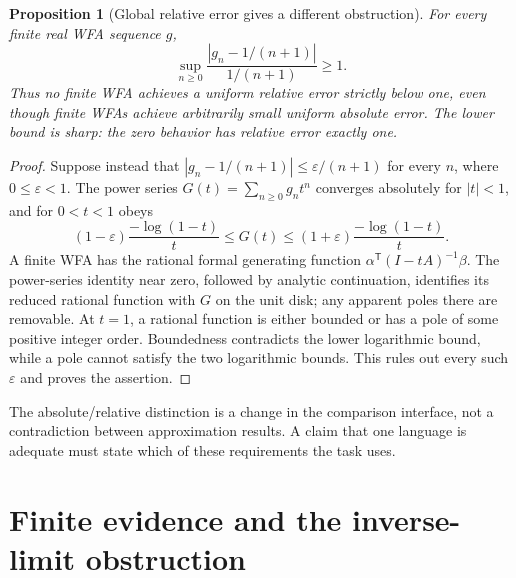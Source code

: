 \documentclass[11pt]{article}
\newtheorem{proposition}[theorem]{Proposition}
\theoremstyle{definition}
\begin{document}
\begin{proposition}[Global relative error gives a different obstruction]
\label{prop:relative-obstruction}
For every finite real WFA sequence $g$,
\[
 \sup_{n\geq0}\frac{|g_n-1/(n+1)|}{1/(n+1)}\geq1.
\]
Thus no finite WFA achieves a uniform relative error strictly below one,
even though finite WFAs achieve arbitrarily small uniform absolute error.
The lower bound is sharp: the zero behavior has relative error exactly one.
\end{proposition}
\begin{proof}
Suppose instead that $|g_n-1/(n+1)|\leq\varepsilon/(n+1)$ for every
$n$, where $0\leq\varepsilon<1$. The power series
$G(t)=\sum_{n\geq0}g_nt^n$ converges absolutely for $|t|<1$, and for
$0<t<1$ obeys
\[
 (1-\varepsilon)\frac{-\log(1-t)}t
 \leq G(t)\leq
 (1+\varepsilon)\frac{-\log(1-t)}t.
\]
A finite WFA has the rational formal generating function
$\alpha^{\mathsf T}(I-tA)^{-1}\beta$. The power-series identity near
zero, followed by analytic continuation, identifies its reduced rational
function with $G$ on the unit disk; any apparent poles there are removable.
At $t=1$, a rational function is either bounded or has a pole of some
positive integer order. Boundedness contradicts the lower logarithmic
bound, while a pole cannot satisfy the two logarithmic bounds. This rules
out every such $\varepsilon$ and proves the assertion.
\end{proof}

The absolute/relative distinction is a change in the comparison interface,
not a contradiction between approximation results. A claim that one
language is adequate must state which of these requirements the task uses.

\section{Finite evidence and the inverse-limit obstruction}
\label{sec:finite}
\end{document}
